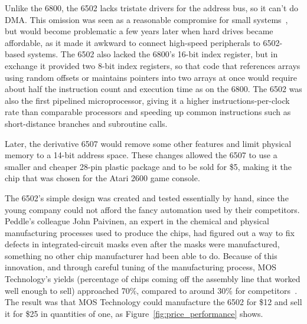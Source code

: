 \begin{tangent}
    Unlike the 6800, the 6502 lacks
    tristate drivers for the address bus, so it can't do DMA.  This
    omission was seen as a reasonable compromise
    for small systems~\cite{byte75:6502}, but would become
    problematic a few years later when hard drives became affordable, as
    it made it awkward to connect high-speed peripherals to 6502-based systems.
    The 6502 also lacked the 6800's 16-bit index register, but in exchange
    it provided two
     8-bit index registers, so that code that references arrays using
     random offsets or maintains pointers into two arrays at once would
     require about half the instruction count and execution time as on
     the 6800.
    The 6502 was also the first pipelined
    microprocessor, giving it a higher instructions-per-clock 
    rate than comparable processors and speeding up
    common instructions such as short-distance branches
     and subroutine calls.

    Later, the derivative 6507 would
    remove some other features and limit
    physical memory to a 14-bit address space.  These changes allowed
    the 6507 to
    use a smaller and cheaper 28-pin 
    plastic package and to be sold for \$5,
    making it the chip that was chosen for the Atari 2600 game console.
\end{tangent}

The 6502's simple design was created and tested essentially by hand,
since the young company could not afford the
fancy automation used by their competitors.
Peddle's colleague John Paivinen, an expert in the chemical
and physical manufacturing processes used to produce the chips, had
figured out a way to fix defects in integrated-circuit masks even after the masks were
manufactured, something no other chip manufacturer had been able to do.
Because of this innovation, and through careful tuning of the manufacturing process,
MOS Technology's yields (percentage of chips coming off the assembly
line that worked well enough to sell) approached 70\%,
compared to around 30\% for competitors~\cite{commodore}.
The result was that MOS Technology could manufacture the 6502 for \$12
and sell it for \$25 in  quantities of one, as
Figure~\ref{fig:price_performance} shows.


